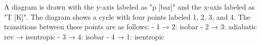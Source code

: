 A diagram is drawn with the y-axis labeled as "p [bar]" and the x-axis labeled as "T [K]". The diagram shows a cycle with four points labeled 1, 2, 3, and 4. The transitions between these points are as follows:  
- 1 → 2: isobar  
- 2 → 3: adiabatic rev → isentropic  
- 3 → 4: isobar  
- 4 → 1: isentropic